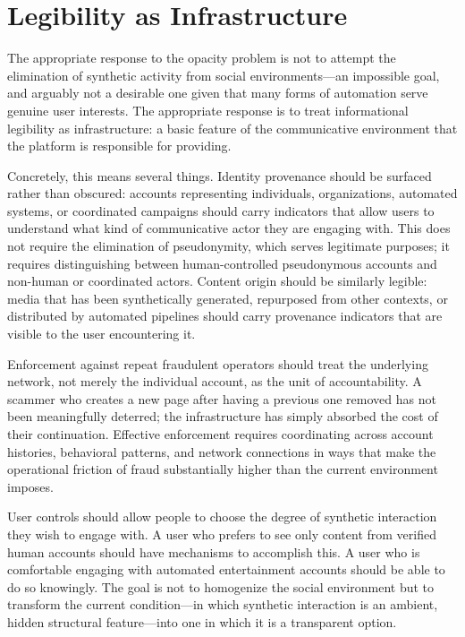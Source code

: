 \documentclass[12pt, a4paper]{article}
\begin{document}
\section{Legibility as Infrastructure}

The appropriate response to the opacity problem is not to attempt the elimination of synthetic activity from social environments---an impossible goal, and arguably not a desirable one given that many forms of automation serve genuine user interests. The appropriate response is to treat informational legibility as infrastructure: a basic feature of the communicative environment that the platform is responsible for providing.

Concretely, this means several things. Identity provenance should be surfaced rather than obscured: accounts representing individuals, organizations, automated systems, or coordinated campaigns should carry indicators that allow users to understand what kind of communicative actor they are engaging with. This does not require the elimination of pseudonymity, which serves legitimate purposes; it requires distinguishing between human-controlled pseudonymous accounts and non-human or coordinated actors. Content origin should be similarly legible: media that has been synthetically generated, repurposed from other contexts, or distributed by automated pipelines should carry provenance indicators that are visible to the user encountering it.

Enforcement against repeat fraudulent operators should treat the underlying network, not merely the individual account, as the unit of accountability. A scammer who creates a new page after having a previous one removed has not been meaningfully deterred; the infrastructure has simply absorbed the cost of their continuation. Effective enforcement requires coordinating across account histories, behavioral patterns, and network connections in ways that make the operational friction of fraud substantially higher than the current environment imposes.

User controls should allow people to choose the degree of synthetic interaction they wish to engage with. A user who prefers to see only content from verified human accounts should have mechanisms to accomplish this. A user who is comfortable engaging with automated entertainment accounts should be able to do so knowingly. The goal is not to homogenize the social environment but to transform the current condition---in which synthetic interaction is an ambient, hidden structural feature---into one in which it is a transparent option.
\end{document}
